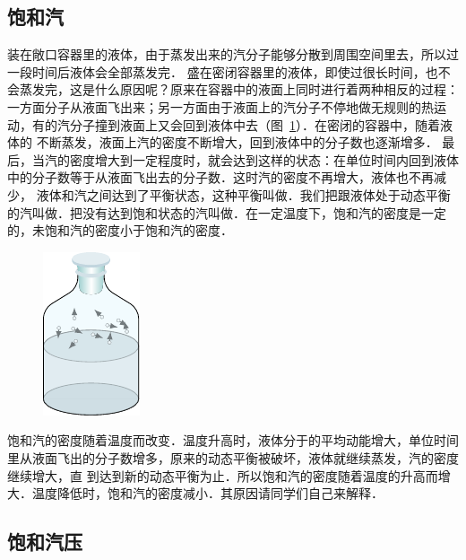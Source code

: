 \subsection{饱和汽} 
装在敞口容器里的液体，由于蒸发出来的汽分子能够分散到周围空间里去，所以过一段时间后液体会全部蒸发完．
盛在密闭容器里的液体，即使过很长时间，也不会蒸发完，这是什么原因呢？原来在容器中的液面上同时进行着两种相反的过程：一方面分子从液面飞出来；另一方面由于液面上的汽分子不停地做无规则的热运动，有的汽分子撞到液面上又会回到液体中去（图~\ref{fig_B_5-2}）．在密闭的容器中，随着液体的
不断蒸发，液面上汽的密度不断增大，回到液体中的分子数也逐渐增多．
最后，当汽的密度增大到一定程度时，就会达到这样的状态：在单位时间内回到液体中的分子数等于从液面飞出去的分子数．这时汽的密度不再增大，液体也不再减少，
液体和汽之间达到了平衡状态，这种平衡叫做．我们把跟液体处于动态平衡的汽叫做．把没有达到饱和状态的汽叫做．在一定温度下，饱和汽的密度是一定的，未饱和汽的密度小于饱和汽的密度．

\begin{figure}[htbp]
  \centering
  \includegraphics{fig/B/5-2.pdf}
  \caption{}\label{fig_B_5-2}
\end{figure}

饱和汽的密度随着温度而改变．温度升高时，液体分于的平均动能增大，单位时间里从液面飞出的分子数增多，原来的动态平衡被破坏，液体就继续蒸发，汽的密度继续增大，直
到达到新的动态平衡为止．所以饱和汽的密度随着温度的升高而增大．温度降低时，饱和汽的密度减小．其原因请同学们自己来解释．

\subsection{饱和汽压} 


